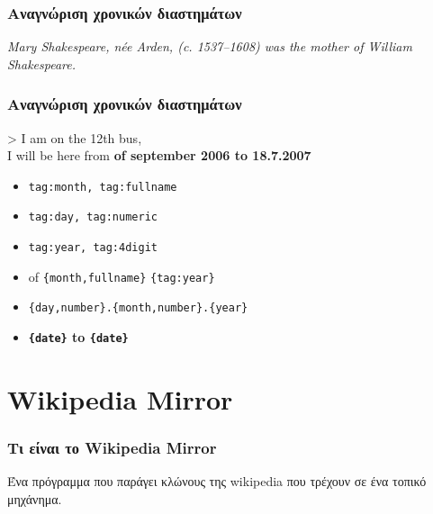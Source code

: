\documentclass[bigger]{beamer}
\newenvironment{code}{\ttfamily}{\par}
\begin{document}
\begin{frame}
  \frametitle{Αναγνώριση χρονικών διαστημάτων}

  \hfill
  \emph{Mary Shakespeare, née Arden, (c. 1537–1608) was the mother of
    William Shakespeare.}
  \hfill
\end{frame}
\begin{frame}
  \frametitle{Αναγνώριση χρονικών διαστημάτων}
  \begin{code}
    > I am on the {12th} bus, \\
    I will be here from \textbf<9>{
      {
        of {september}
        {\color<5-6>{magenta}2006}} to
      {18.7.{2007}}} \\
    \vspace{3.0}
  \end{code}
  \vfill
  \begin{itemize}
  \item<3-> {\color{blue}\texttt{tag:month, tag:fullname}}
  \item<4-> {\color{red}\texttt{tag:day, tag:numeric}}
  \item<5-> {\color{magenta}\texttt{tag:year, tag:4digit}}
  \item<6-> { of
      {\color<6>{blue}\texttt{\{month,fullname\}}}
      {\color<6>{magenta}\texttt{\{tag:year\}}}}
  \item<8-> \texttt{{\color{violet}\{day,number\}.\{month,number\}.\{year\}}}
  \item<9-> \textbf{{\color<9->{violet}\texttt{\{date\}}} to
      {\color<9>{violet}\texttt{\{date\}}}}
  \end{itemize}
\end{frame}

\section{Wikipedia Mirror}

\begin{frame}
  \frametitle{Τι είναι το Wikipedia Mirror}

  Ένα πρόγραμμα που παράγει κλώνους της wikipedia που τρέχουν σε ένα
  τοπικό μηχάνημα.

\end{frame}
\end{document}
